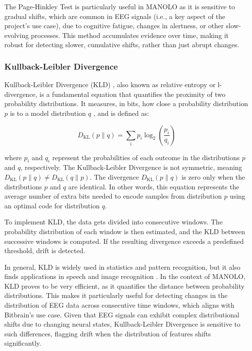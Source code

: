 The Page-Hinkley Test is particularly useful in MANOLO as it is sensitive to gradual shifts, which are common in EEG signals (i.e., a key aspect of the project's use case), due to cognitive fatigue, changes in alertness, or other slow-evolving processes. This method accumulates evidence over time, making it robust for detecting slower, cumulative shifts, rather than just abrupt changes.

\subsubsection{Kullback-Leibler Divergence}

Kullback-Leibler Divergence (KLD) \cite{joyce2011kullback}, also known as relative entropy or l-divergence, is a fundamental equation that quantifies the proximity of two probability distributions. It measures, in bits, how close a probability distribution \( p \) is to a model distribution \( q \) \cite{shlens2014notes}\cite{vanerven2014renyi}, and is defined as:

\begin{equation}
D_{\text{KL}}(p \parallel q) = \sum_i p_i \log_2 \left( \frac{p_i}{q_i} \right)
\end{equation}

where \( p_i \) and \( q_i \) represent the probabilities of each outcome in the distributions \( p \) and \( q \), respectively. The Kullback-Leibler Divergence is not symmetric, meaning \( D_{\text{KL}}(p \parallel q) \neq D_{\text{KL}}(q \parallel p) \). The divergence \( D_{\text{KL}}(p \parallel q) \) is zero only when the distributions \( p \) and \( q \) are identical. In other words, this equation represents the average number of extra bits needed to encode samples from distribution \( p \) using an optimal code for distribution \( q \). 

To implement KLD, the data gets divided into consecutive windows. The probability distribution of each window is then estimated, and the KLD between successive windows is computed. If the resulting divergence exceeds a predefined threshold, drift is detected.

In general, KLD is widely used in statistics and pattern recognition, but it also finds applications in speech and image recognition \cite{hershey2007approximating}. In the context of MANOLO, KLD proves to be very efficient, as it quantifies the distance between probability distributions. This makes it particularly useful for detecting changes in the distribution of EEG data across consecutive time windows, which aligns with Bitbrain’s use case. Given that EEG signals can exhibit complex distributional shifts due to changing neural states, Kullback-Leibler Divergence is sensitive to such differences, flagging drift when the distribution of features shifts significantly.

